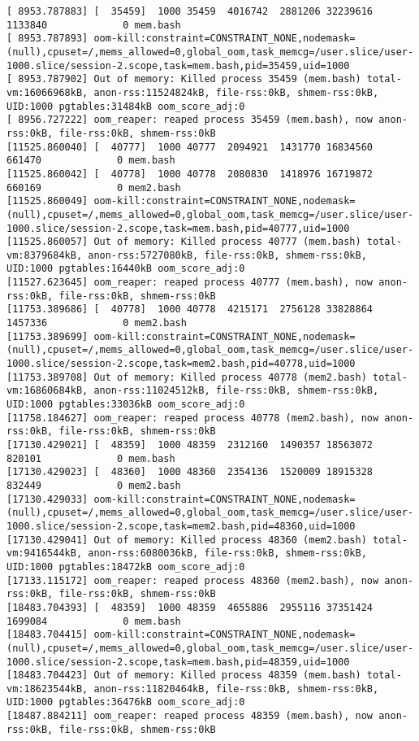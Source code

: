\documentclass[10pt, a4paper]{article}
\begin{document}
\begin{lstlisting}
[ 8953.787883] [  35459]  1000 35459  4016742  2881206 32239616  1133840             0 mem.bash
[ 8953.787893] oom-kill:constraint=CONSTRAINT_NONE,nodemask=(null),cpuset=/,mems_allowed=0,global_oom,task_memcg=/user.slice/user-1000.slice/session-2.scope,task=mem.bash,pid=35459,uid=1000
[ 8953.787902] Out of memory: Killed process 35459 (mem.bash) total-vm:16066968kB, anon-rss:11524824kB, file-rss:0kB, shmem-rss:0kB, UID:1000 pgtables:31484kB oom_score_adj:0
[ 8956.727222] oom_reaper: reaped process 35459 (mem.bash), now anon-rss:0kB, file-rss:0kB, shmem-rss:0kB
[11525.860040] [  40777]  1000 40777  2094921  1431770 16834560   661470             0 mem.bash
[11525.860042] [  40778]  1000 40778  2080830  1418976 16719872   660169             0 mem2.bash
[11525.860049] oom-kill:constraint=CONSTRAINT_NONE,nodemask=(null),cpuset=/,mems_allowed=0,global_oom,task_memcg=/user.slice/user-1000.slice/session-2.scope,task=mem.bash,pid=40777,uid=1000
[11525.860057] Out of memory: Killed process 40777 (mem.bash) total-vm:8379684kB, anon-rss:5727080kB, file-rss:0kB, shmem-rss:0kB, UID:1000 pgtables:16440kB oom_score_adj:0
[11527.623645] oom_reaper: reaped process 40777 (mem.bash), now anon-rss:0kB, file-rss:0kB, shmem-rss:0kB
[11753.389686] [  40778]  1000 40778  4215171  2756128 33828864  1457336             0 mem2.bash
[11753.389699] oom-kill:constraint=CONSTRAINT_NONE,nodemask=(null),cpuset=/,mems_allowed=0,global_oom,task_memcg=/user.slice/user-1000.slice/session-2.scope,task=mem2.bash,pid=40778,uid=1000
[11753.389708] Out of memory: Killed process 40778 (mem2.bash) total-vm:16860684kB, anon-rss:11024512kB, file-rss:0kB, shmem-rss:0kB, UID:1000 pgtables:33036kB oom_score_adj:0
[11758.184627] oom_reaper: reaped process 40778 (mem2.bash), now anon-rss:0kB, file-rss:0kB, shmem-rss:0kB
[17130.429021] [  48359]  1000 48359  2312160  1490357 18563072   820101             0 mem.bash
[17130.429023] [  48360]  1000 48360  2354136  1520009 18915328   832449             0 mem2.bash
[17130.429033] oom-kill:constraint=CONSTRAINT_NONE,nodemask=(null),cpuset=/,mems_allowed=0,global_oom,task_memcg=/user.slice/user-1000.slice/session-2.scope,task=mem2.bash,pid=48360,uid=1000
[17130.429041] Out of memory: Killed process 48360 (mem2.bash) total-vm:9416544kB, anon-rss:6080036kB, file-rss:0kB, shmem-rss:0kB, UID:1000 pgtables:18472kB oom_score_adj:0
[17133.115172] oom_reaper: reaped process 48360 (mem2.bash), now anon-rss:0kB, file-rss:0kB, shmem-rss:0kB
[18483.704393] [  48359]  1000 48359  4655886  2955116 37351424  1699084             0 mem.bash
[18483.704415] oom-kill:constraint=CONSTRAINT_NONE,nodemask=(null),cpuset=/,mems_allowed=0,global_oom,task_memcg=/user.slice/user-1000.slice/session-2.scope,task=mem.bash,pid=48359,uid=1000
[18483.704423] Out of memory: Killed process 48359 (mem.bash) total-vm:18623544kB, anon-rss:11820464kB, file-rss:0kB, shmem-rss:0kB, UID:1000 pgtables:36476kB oom_score_adj:0
[18487.884211] oom_reaper: reaped process 48359 (mem.bash), now anon-rss:0kB, file-rss:0kB, shmem-rss:0kB
\end{lstlisting}
\end{document}
